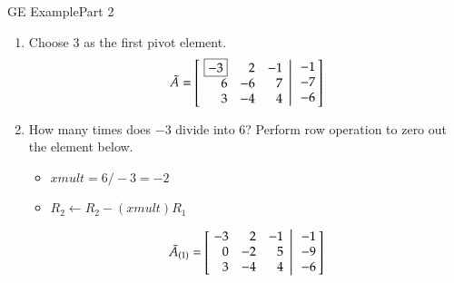 \documentclass[10pt]{beamer}
\begin{document}
\begin{frame}{GE Example}{Part 2}
\begin{enumerate}
    \item[2.] Choose 3 as the first pivot element. 
\begin{equation*}
    \tilde{A}  =
      \left[
           \left.\negthickspace\begin{array}{rrr}  \boxed{-3} &  2 & -1  \\
                                                    6 & -6 &  7 \\
                                                    3 & -4 &  4 \end{array}
           \right|\begin{array}{r} -1 \\ -7 \\ -6 \end{array}\negthickspace\right]
\end{equation*}

    \item[3.] How many times does $\boxed{-3}$ divide into $6$? Perform row operation to zero out the element below.
    \begin{itemize}
        \item $xmult =6/-3=-2$
        \item $R_2\leftarrow R_2-(xmult)R_1$
    \end{itemize}
\begin{equation*}
    \tilde{A}_{(1)} = \left[
           \left.\negthickspace\begin{array}{rrr}  -3 &  2 & -1 \\
                                                    0 & -2 &  5 \\
                                                    3 & -4 &  4 \end{array}
           \right|\begin{array}{r} -1 \\ -9 \\ -6 \end{array}\negthickspace\right]
\end{equation*}
\end{enumerate}
\end{frame}
\end{document}

